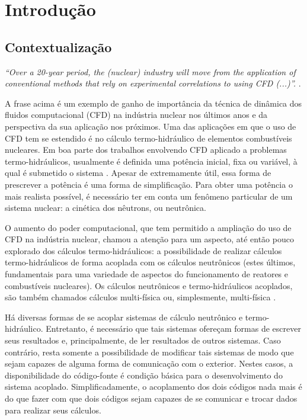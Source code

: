 \chapter{Introdução}
\label{chap:introducao}



\section{Contextualização}

\emph{``Over a 20-year period, the (nuclear) industry will move from 
the application of conventional methods that rely on 
experimental correlations to using CFD (...)''.} \cite[p.~655]{Baglietto2011}.

A frase acima é um exemplo de ganho de importância da técnica de dinâmica dos fluidos 
computacional (CFD) na indústria nuclear nos últimos anos e da perspectiva da sua aplicação 
nos próximos. Uma das aplicações em que o uso de CFD tem se estendido é no cálculo termo-hidráulico
de elementos combustíveis nucleares. Em boa parte dos trabalhos envolvendo CFD aplicado
a problemas termo-hidráulicos, usualmente é definida uma potência inicial, fixa ou variável, à qual
é submetido o sistema \cite{Ustinenko2008}. Apesar de extremamente útil, essa forma de prescrever a
potência é uma forma de simplificação. Para obter uma potência o mais realista possível, é necessário
ter em conta um fenômeno particular de um sistema nuclear: a cinética dos nêutrons, ou neutrônica.

O aumento do poder computacional, que tem permitido a ampliação do uso de CFD na indústria nuclear, chamou a
atenção para um aspecto, até então pouco explorado dos cálculos termo-hidráulicos: a possibilidade de
realizar cálculos termo-hidráulicos de forma acoplada com os cálculos neutrônicos (estes últimos, fundamentais para
uma variedade de aspectos do funcionamento de reatores e combustíveis nucleares). Os cálculos neutrônicos e termo-hidráulicos
acoplados, são também chamados cálculos multi-física ou, simplesmente, multi-física \cite{Leppanen2012}. 

Há diversas formas de se acoplar sistemas de cálculo neutrônico e termo-hidráulico. Entretanto, é necessário que tais
sistemas ofereçam formas de escrever seus resultados e, principalmente, de ler resultados de outros sistemas. Caso contrário,
resta somente a possibilidade de modificar tais sistemas de modo que sejam capazes de alguma forma de comunicação com o
exterior. Nestes casos, a disponibilidade do código-fonte é condição básica para o desenvolvimento do sistema acoplado.
Simplificadamente, o acoplamento dos dois códigos nada mais é do que fazer com que dois códigos sejam capazes de se comunicar e
trocar dados para realizar seus cálculos.





